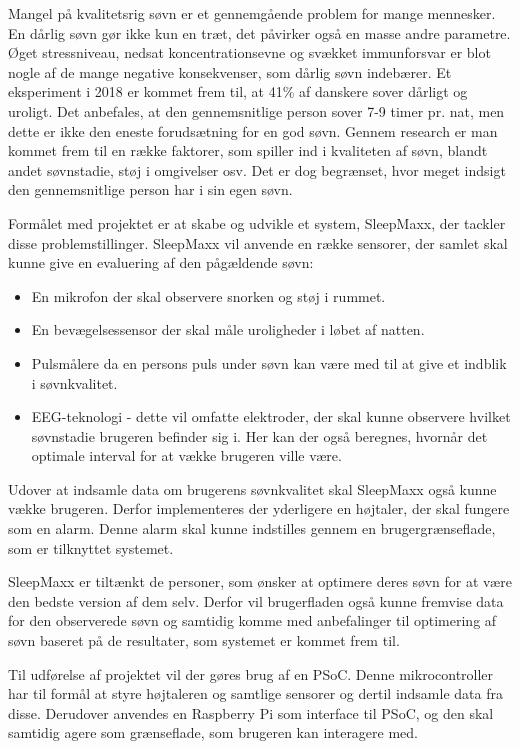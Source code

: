 \documentclass{article}
\begin{document}
\newpage

Mangel på kvalitetsrig søvn er et gennemgående problem for mange mennesker. En dårlig søvn gør ikke kun en træt, det påvirker også en masse andre parametre. Øget stressniveau, nedsat koncentrationsevne og svækket immunforsvar er blot nogle af de mange negative konsekvenser, som dårlig søvn indebærer. Et eksperiment i 2018 er kommet frem til, at 41\% af danskere sover dårligt og uroligt. Det anbefales, at den gennemsnitlige person sover 7-9 timer pr. nat, men dette er ikke den eneste forudsætning for en god søvn. Gennem research er man kommet frem til en række faktorer, som spiller ind i kvaliteten af søvn, blandt andet søvnstadie, støj i omgivelser osv. Det er dog begrænset, hvor meget indsigt den gennemsnitlige person har i sin egen søvn.

Formålet med projektet er at skabe og udvikle et system, SleepMaxx, der tackler disse problemstillinger. SleepMaxx vil anvende en række sensorer, der samlet skal kunne give en evaluering af den pågældende søvn:

\begin{itemize}
    \item En mikrofon der skal observere snorken og støj i rummet.
    \item En bevægelsessensor der skal måle uroligheder i løbet af natten.
    \item Pulsmålere da en persons puls under søvn kan være med til at give et indblik i søvnkvalitet.
    \item EEG-teknologi - dette vil omfatte elektroder, der skal kunne observere hvilket søvnstadie brugeren befinder sig i. Her kan der også beregnes, hvornår det optimale interval for at vække brugeren ville være.
\end{itemize}

Udover at indsamle data om brugerens søvnkvalitet skal SleepMaxx også kunne vække brugeren. Derfor implementeres der yderligere en højtaler, der skal fungere som en alarm. Denne alarm skal kunne indstilles gennem en brugergrænseflade, som er tilknyttet systemet.

SleepMaxx er tiltænkt de personer, som ønsker at optimere deres søvn for at være den bedste version af dem selv. Derfor vil brugerfladen også kunne fremvise data for den observerede søvn og samtidig komme med anbefalinger til optimering af søvn baseret på de resultater, som systemet er kommet frem til.

Til udførelse af projektet vil der gøres brug af en PSoC. Denne mikrocontroller har til formål at styre højtaleren og samtlige sensorer og dertil indsamle data fra disse. Derudover anvendes en Raspberry Pi som interface til PSoC, og den skal samtidig agere som grænseflade, som brugeren kan interagere med.
\end{document}
